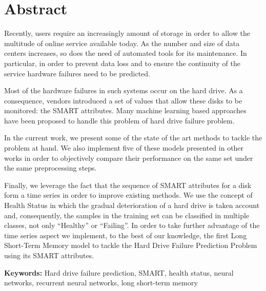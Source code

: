 \chapter*{Abstract}

Recently, users require an increasingly amount of storage in order to allow the multitude of online service available today.
As the number and size of data centers increases, so does the need of automated tools for its maintenance.
In particular, in order to prevent data loss and to ensure the continuity of the service hardware failures need to be predicted.

Most of the hardware failures in such systems occur on the hard drive.
As a consequence, vendors introduced a set of values that allow these disks to be monitored: the SMART attributes.
Many machine learning based approaches have been proposed to handle this problem of hard drive failure problem.

In the current work, we present some of the state of the art methods to tackle the problem at hand.
We also implement five of these models presented in other works in order to objectively compare their performance on the same set under the same preprocessing steps.

Finally, we leverage the fact that the sequence of SMART attributes for a disk form a time series in order to improve existing methods.
We use the concept of Health Status in which the gradual deterioration of a hard drive is taken account and, consequently, the samples in the training set can be classified in multiple classes, not only ``Healthy'' or ``Failing''.
In order to take further advantage of the time series aspect we implement, to the best of our knowledge, the first Long Short-Term Memory model to tackle the Hard Drive Failure Prediction Problem using its SMART attributes.

\textbf{Keywords:} Hard drive failure prediction, SMART, health status, neural networks, recurrent neural networks, long short-term memory 